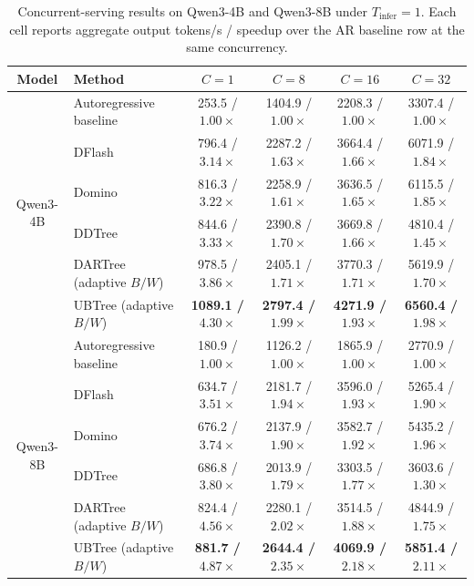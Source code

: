 \begin{table}[t]
\centering
\caption{Concurrent-serving results on Qwen3-4B and Qwen3-8B under $T_{\mathrm{infer}} = 1$. Each cell reports aggregate output tokens/s / speedup over the AR baseline row at the same concurrency.}
\label{tab:concurrency-results}
\begingroup
\scriptsize
\setlength{\tabcolsep}{7pt}
\renewcommand{\arraystretch}{0.95}
\begin{tabular}{@{}clcccc@{}}
\toprule
Model & Method & $C=1$ & $C=8$ & $C=16$ & $C=32$ \\
\midrule
\multirow{6}{*}{Qwen3-4B}
& Autoregressive baseline                         & 253.5 / $1.00\times$  & 1404.9 / $1.00\times$ & 2208.3 / $1.00\times$ & 3307.4 / $1.00\times$ \\
\cmidrule(l){2-6}
& DFlash                      & 796.4 / $3.14\times$   & 2287.2 / $1.63\times$  & 3664.4 / $1.66\times$ & 6071.9 / $1.84\times$ \\
& Domino                      & 816.3 / $3.22\times$   & 2258.9 / $1.61\times$  & 3636.5 / $1.65\times$ & 6115.5 / $1.85\times$ \\
& DDTree                      & 844.6 / $3.33\times$   & 2390.8 / $1.70\times$  & 3669.8 / $1.66\times$ & 4810.4 / $1.45\times$ \\
& DARTree (adaptive $B/W$)   & 978.5 / $3.86\times$   & 2405.1 / $1.71\times$  & 3770.3 / $1.71\times$ & 5619.9 / $1.70\times$ \\
& UBTree (adaptive $B/W$)    & \textbf{1089.1 / $4.30\times$} & \textbf{2797.4 / $1.99\times$} & \textbf{4271.9 / $1.93\times$} & \textbf{6560.4 / $1.98\times$} \\
\midrule
\multirow{6}{*}{Qwen3-8B}
& Autoregressive baseline                          & 180.9 / $1.00\times$   & 1126.2 / $1.00\times$  & 1865.9 / $1.00\times$  & 2770.9 / $1.00\times$ \\
\cmidrule(l){2-6}
& DFlash                      & 634.7 / $3.51\times$   & 2181.7 / $1.94\times$  & 3596.0 / $1.93\times$  & 5265.4 / $1.90\times$ \\
& Domino                      & 676.2 / $3.74\times$   & 2137.9 / $1.90\times$  & 3582.7 / $1.92\times$  & 5435.2 / $1.96\times$ \\
& DDTree                      & 686.8 / $3.80\times$   & 2013.9 / $1.79\times$  & 3303.5 / $1.77\times$  & 3603.6 / $1.30\times$ \\
& DARTree (adaptive $B/W$)   & 824.4 / $4.56\times$   & 2280.1 / $2.02\times$  & 3514.5 / $1.88\times$  & 4844.9 / $1.75\times$ \\
& UBTree (adaptive $B/W$)    & \textbf{881.7 / $4.87\times$} & \textbf{2644.4 / $2.35\times$} & \textbf{4069.9 / $2.18\times$} & \textbf{5851.4 / $2.11\times$} \\
\bottomrule
\end{tabular}
\endgroup
\end{table}

